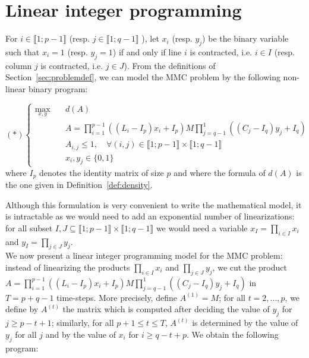 
\section{Linear integer programming}
\label{sec:linearprog}

For $i \in \llbracket 1; p-1 \rrbracket$ (resp.  $j \in \llbracket 1; q-1 \rrbracket$ ), let $x_i$ (resp. $y_j$) be the binary variable such that $x_i=1$ (resp. $y_j=1$) if and only if line $i$ is contracted, i.e. $i \in I$ (resp. column $j$ is contracted, i.e. $j \in J$). From the definitions of Section~\ref{sec:problemdef}, we can model the MMC problem by the following non-linear binary program:

\begin{equation*}
(\ast)\left\{
\begin{array}{lll}
\max\limits_{x,y}  \quad	& d(A)  \\
& A= \prod\limits_{i=1}^{p-1}((L_i-I_p)x_i+I_p)M\prod\limits_{j=q-1}^{1}((C_j-I_q)y_j+I_q) \\
& A_{i,j} \le 1, \quad \forall (i,j) \in \llbracket 1; p-1 \rrbracket \times \llbracket 1; q-1 \rrbracket \\
& x_i,y_j \in \{0,1\}
\end{array}\right.
\end{equation*}
where $I_p$ denotes the identity matrix of size $p$ and where the formula of $d(A)$ is the one given in Definition~\ref{def:density}.

\noindent Although this formulation is very convenient to write the mathematical model, it is intractable as we would need to add an exponential number of linearizations: for all subset $ I,J \subseteq \llbracket 1; p-1 \rrbracket \times \llbracket 1; q-1 \rrbracket$ we would need a variable $x_I=\prod\limits_{i \in I}x_i $ and $y_I=\prod\limits_{j \in J}y_j $.\\

\noindent We now present a linear integer programming model for the MMC problem: instead of linearizing the products $\prod\limits_{i \in I}x_i$ and $\prod\limits_{j \in J}y_j$, we cut the product \\
$A= \prod\limits_{i=1}^{p-1}((L_i-I_p)x_i+I_p)M\prod\limits_{j=q-1}^{1}((C_j-I_q)y_j+I_q) $ in $T=p+q-1$ time-steps. More precisely, define $A^{(1)}=M$; for all $t=2,...,p$, we define by $A^{(t)}$ the matrix which is computed after deciding the value of $y_j$ for $j \ge p-t+1$; similarly, for all $p+1\le t \le T$, $A^{(t)}$ is determined by the value of $y_j$ for all $j$ and by the value of $x_i$ for $i \ge q -t+p $. We obtain the following program:

